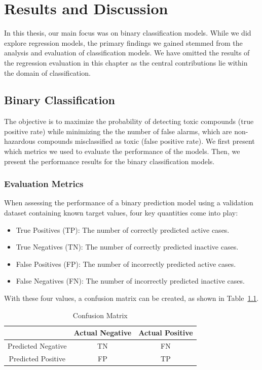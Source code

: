 \chapter{Results and Discussion}\label{chap:results_discussion}

In this thesis, our main focus was on binary classification models. While we did explore regression models, the primary findings we gained stemmed from the analysis and evaluation of classification models. We have omitted the results of the regression evaluation in this chapter as the central contributions lie within the domain of classification.

\section{Binary Classification}
The objective is to maximize the probability of detecting toxic compounds (true positive rate) while minimizing the the number of false alarms, which are non-hazardous compounds misclassified as toxic (false positive rate). We first present which metrics we used to evaluate the performance of the models. Then, we present the performance results for the binary classification models.

\subsection{Evaluation Metrics}
When assessing the performance of a binary prediction model using a validation dataset containing known target values, four key quantities come into play:

\begin{itemize}
  \item True Positives (TP): The number of correctly predicted active cases.
  \item True Negatives (TN): The number of correctly predicted inactive cases.
  \item False Positives (FP): The number of incorrectly predicted active cases.
  \item False Negatives (FN): The number of incorrectly predicted inactive cases.
\end{itemize}

With these four values, a confusion matrix can be created, as shown in Table~\ref{tab:confusion_matrix}.

\begin{table}[h]
  \centering
  \caption{Confusion Matrix}
  \label{tab:confusion_matrix}
  \setlength{\tabcolsep}{10pt} %
  \renewcommand{\arraystretch}{1.5} %
  \begin{tabular}{|c|c|c|}
  \cline{2-3}
  \multicolumn{1}{c|}{} & Actual Negative & Actual Positive \\
  \hline
  Predicted Negative & TN & FN \\
  \hline
  Predicted Positive & FP & TP \\
  \hline
  \end{tabular}
\end{table}

